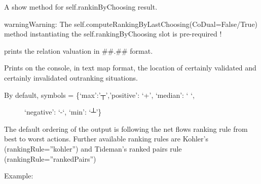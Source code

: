 \documentclass[letterpaper,10pt,english]{sphinxmanual}
\begin{document}
\begin{fulllineitems}
\begin{fulllineitems}
\end{fulllineitems}


\begin{fulllineitems}
\label{techDoc:digraphs.Digraph.showRankingByLastChoosing}
A show method for self.rankinByChoosing result.

\begin{notice}{warning}{Warning:}
The self.computeRankingByLastChoosing(CoDual=False/True) method instantiating the self.rankingByChoosing slot is pre-required !
\end{notice}

\end{fulllineitems}


\begin{fulllineitems}
\label{techDoc:digraphs.Digraph.showRelation}
prints the relation valuation in \#\#.\#\# format.

\end{fulllineitems}


\begin{fulllineitems}
\label{techDoc:digraphs.Digraph.showRelationMap}
Prints on the console, in text map format, the location of
certainly validated and certainly invalidated outranking situations.
\begin{description}
\item[{By default, symbols = \{`max':'┬','positive': `+', `median': ` `,}] \leavevmode
`negative': `-`, `min': `┴'\}

\end{description}

The default ordering of the output is following the net flows ranking rule
from best to worst actions. Further available ranking rules are Kohler's (rankingRule=''kohler'')
and Tideman's ranked pairs rule (rankingRule=''rankedPairs'')

Example:


\end{fulllineitems}
\end{fulllineitems}
\end{document}
